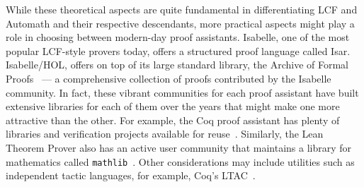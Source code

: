 \documentclass{article}
\begin{document}
	While these theoretical aspects 
	are quite fundamental in 
	differentiating LCF and Automath 
	and their respective descendants, 
	more practical aspects might 
	play a role in choosing between 
	modern-day proof assistants. 
	Isabelle, one of the most 
	popular LCF-style provers today,
	offers a structured proof language
	called Isar. Isabelle/HOL, 
	offers on top of its large 
	standard library, the Archive
	of Formal Proofs~\cite{afp} --- 
	a comprehensive collection of 
	proofs contributed by the 
	Isabelle community. In fact, 
	these vibrant communities for 
	each proof assistant have 
	built extensive libraries 
	for each of them over the years 
	that might make one more 
	attractive than the other. For 
	example, the Coq proof assistant
	has plenty of libraries and 
	verification projects available 
	for reuse~\cite{coqlib}. Similarly, 
	the Lean Theorem Prover also has 
	an active user community that 
	maintains a library for 
	mathematics called 
	\texttt{mathlib}~\cite{10.1145/3372885.3373824}.
	Other considerations may 
	include utilities such as 
	independent tactic languages, 
	for example, Coq's 
	LTAC~\cite{10.1007/3-540-44404-1_7}.
	
  	


\end{document}
